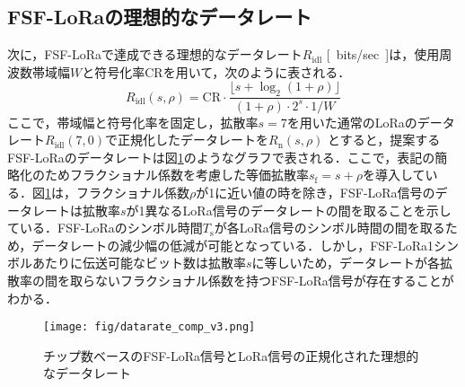 \documentclass[technicalreport]{ieicej}
\begin{document}
\subsection{FSF-LoRaの理想的なデータレート}
次に，FSF-LoRaで達成できる理想的なデータレート$R_\mathrm{idl}$ \si{[bits/sec]}は，使用周波数帯域幅$W$と符号化率$\mathrm{CR}$を用いて，次のように表される．
\begin{equation}
    R_\mathrm{idl}(s,\rho)=\mathrm{CR}\cdot\frac{\lfloor s+\log_2(1+\rho)\rfloor}{(1+\rho)\cdot2^s\cdot1/W}
\end{equation}
ここで，帯域幅と符号化率を固定し，拡散率$s=7$を用いた通常のLoRaのデータレート$R_\mathrm{idl}(7,0)$で正規化したデータレートを$R_\mathrm{n}(s,\rho)$%
とすると，提案するFSF-LoRaのデータレートは図\ref{fig:datarate}のようなグラフで表される．ここで，表記の簡略化のためフラクショナル係数を考慮した等価拡散率$s_\mathrm{f}=s+\rho$を導入している．図\ref{fig:datarate}は，フラクショナル係数$\rho$が1に近い値の時を除き，FSF-LoRa信号のデータレートは拡散率$s$が1異なるLoRa信号のデータレートの間を取ることを示している．FSF-LoRaのシンボル時間$T_\mathrm{s}$が各LoRa信号のシンボル時間の間を取るため，データレートの減少幅の低減が可能となっている．しかし，FSF-LoRa1シンボルあたりに伝送可能なビット数は拡散率$s$に等しいため，データレートが各拡散率の間を取らないフラクショナル係数を持つFSF-LoRa信号が存在することがわかる．

\begin{figure}[t] 
\centering
\texttt{[image: fig/datarate\_comp\_v3.png]}
\caption{チップ数ベースのFSF-LoRa信号とLoRa信号の正規化された理想的なデータレート}
\label{fig:datarate}
\end{figure}
\end{document}
